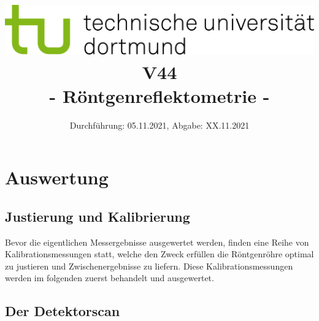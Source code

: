 
\usepackage{romannum}
\usepackage{listings}
\lstset{numbers=left, numberstyle=\tiny, numbersep=5pt}
\lstset{language=Perl}

\title{\includegraphics[scale=0.8]{../logo.jpg} \\ \vspace*{1cm} V44 \\ - Röntgenreflektometrie -}

\date{Durchführung: 05.11.2021, Abgabe: XX.11.2021}



\maketitle

\tableofcontents
\newpage


\section{Auswertung}
\subsection{Justierung und Kalibrierung}
Bevor die eigentlichen Messergebnisse ausgewertet werden, finden eine Reihe von Kalibrationsmessungen statt,
welche den Zweck erfüllen die Röntgenröhre optimal zu justieren und Zwischenergebnisse zu liefern.
Diese Kalibrationsmessungen werden im folgenden zuerst behandelt und ausgewertet.

\subsection{Der Detektorscan}

